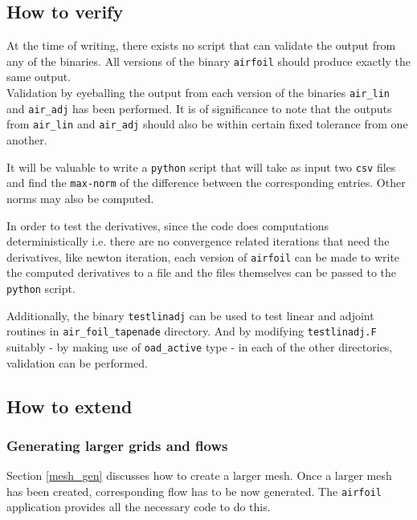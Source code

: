 \subsection{How to verify}\label{airfoil_verify}
At the time of writing, there exists no script that can validate the output from any of the binaries. All versions of the binary \texttt{airfoil} should produce exactly the same output.\\

\noindent Validation by eyeballing the output from each version of the binaries \texttt{air\_lin} and  \texttt{air\_adj} has been performed. It is of significance to note that the outputs from \texttt{air\_lin} and  \texttt{air\_adj} should also be within certain fixed tolerance from one another.

\begin{TodoPar}
\noindent It will be valuable to write a \texttt{python} script that will take as input two \texttt{csv} files and find the \texttt{max-norm} of the difference between the corresponding entries. Other norms may also be computed. 
\end{TodoPar}

\noindent In order to test the derivatives, since the code does computations deterministically i.e. there are no convergence related iterations that need the derivatives, like newton iteration, each version of \texttt{airfoil} can be made to write the computed derivatives to a file and the files themselves can be passed to the \texttt{python} script.\\

\begin{TodoPar}
\noindent Additionally, the binary \texttt{testlinadj} can be used to test linear and adjoint routines in \texttt{air\_foil\_tapenade} directory. And by modifying \texttt{testlinadj.F} suitably - by making use of \texttt{oad\_active} type - in each of the other directories, validation can be performed.
\end{TodoPar}
\subsection{How to extend}
\subsubsection{Generating larger grids and flows}
Section \ref{mesh_gen} discusses how to create a larger mesh. Once a larger mesh has been created, corresponding flow has to be now generated. The \texttt{airfoil} application provides all the necessary code to do this. \\

